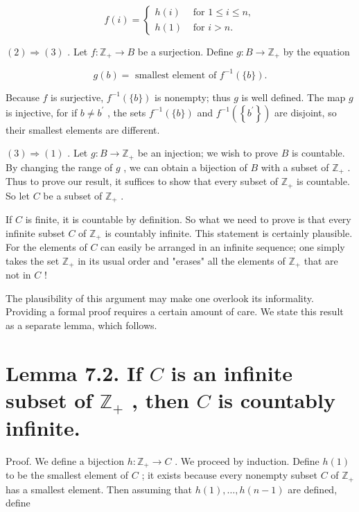\[
f\left( i\right)  = \left\{  \begin{array}{ll} h\left( i\right) & \text{ for }1 \leq  i \leq  n, \\  h\left( 1\right) & \text{ for }i > n. \end{array}\right.
\]

\(\left( 2\right)  \Rightarrow  \left( 3\right)\) . Let \(f : {\mathbb{Z}}_{ + } \rightarrow  B\) be a surjection. Define \(g : B \rightarrow  {\mathbb{Z}}_{ + }\) by the equation

\[
g\left( b\right)  = \text{ smallest element of }{f}^{-1}\left( {\{ b\} }\right) .
\]

Because \(f\) is surjective, \({f}^{-1}\left( {\{ b\} }\right)\) is nonempty; thus \(g\) is well defined. The map \(g\) is injective, for if \(b \neq  {b}^{\prime }\) , the sets \({f}^{-1}\left( {\{ b\} }\right)\) and \({f}^{-1}\left( \left\{  {b}^{\prime }\right\}  \right)\) are disjoint, so their smallest elements are different.

\(\left( 3\right)  \Rightarrow  \left( 1\right)\) . Let \(g : B \rightarrow  {\mathbb{Z}}_{ + }\) be an injection; we wish to prove \(B\) is countable. By changing the range of \(g\) , we can obtain a bijection of \(B\) with a subset of \({\mathbb{Z}}_{ + }\) . Thus to prove our result, it suffices to show that every subset of \({\mathbb{Z}}_{ + }\) is countable. So let \(C\) be a subset of \({\mathbb{Z}}_{ + }\) .

If \(C\) is finite, it is countable by definition. So what we need to prove is that every infinite subset \(C\) of \({\mathbb{Z}}_{ + }\) is countably infinite. This statement is certainly plausible. For the elements of \(C\) can easily be arranged in an infinite sequence; one simply takes the set \({\mathbb{Z}}_{ + }\) in its usual order and "erases" all the elements of \({\mathbb{Z}}_{ + }\) that are not in \(C\) !

The plausibility of this argument may make one overlook its informality. Providing a formal proof requires a certain amount of care. We state this result as a separate lemma, which follows.

\section*{Lemma 7.2. If \(C\) is an infinite subset of \({\mathbb{Z}}_{ + }\) , then \(C\) is countably infinite.}

Proof. We define a bijection \(h : {\mathbb{Z}}_{ + } \rightarrow  C\) . We proceed by induction. Define \(h\left( 1\right)\) to be the smallest element of \(C\) ; it exists because every nonempty subset \(C\) of \({\mathbb{Z}}_{ + }\) has a smallest element. Then assuming that \(h\left( 1\right) ,\ldots ,h\left( {n - 1}\right)\) are defined, define

